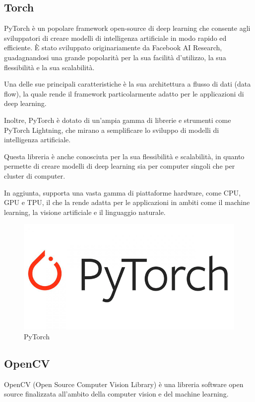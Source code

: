 \subsection{Torch}
PyTorch è un popolare framework open-source di deep learning che consente agli sviluppatori di creare modelli di intelligenza artificiale in modo rapido ed efficiente. È stato sviluppato originariamente da Facebook AI Research, guadagnandosi una grande popolarità per la sua facilità d'utilizzo, la sua flessibilità e la sua scalabilità.

Una delle sue principali caratteristiche è la sua architettura a flusso di dati (data flow), la quale rende il framework particolarmente adatto per le applicazioni di deep learning. 

Inoltre, PyTorch è dotato di un'ampia gamma di librerie e strumenti come PyTorch Lightning, che mirano a semplificare lo sviluppo di modelli di intelligenza artificiale.

Questa libreria è anche conosciuta per la sua flessibilità e scalabilità, in quanto permette di creare modelli di deep learning sia per computer singoli che per cluster di computer. 

In aggiunta, supporta una vasta gamma di piattaforme hardware, come CPU, GPU e TPU, il che la rende adatta per le applicazioni in ambiti come il machine learning, la visione artificiale e il linguaggio naturale.

\begin{figure}
    \begin{center}    
        \includegraphics[width=0.9\linewidth]{images/image7.png}
        \caption{PyTorch}
    \end{center}
\end{figure}

\subsection{OpenCV}
OpenCV (Open Source Computer Vision Library) \cite{OpenCv} è una libreria software open source finalizzata all’ambito della computer vision e del machine learning. 

